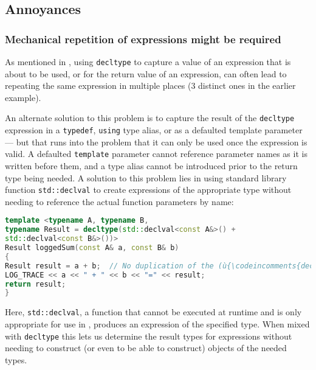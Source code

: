 \subsection[Annoyances]{Annoyances}\label{annoyances-decltype}

\subsubsection{Mechanical repetition of expressions might be required}\label{decltype-mechanical}

As mentioned in
,
using \lstinline!decltype! to capture a value of an expression that is about to be used, or for the return value of an expression, can often lead to repeating the same expression in multiple places (3 distinct ones in the earlier example).

An alternate solution to this problem is to capture the result of the \lstinline!decltype! expression in a \lstinline!typedef!, \lstinline!using! type alias, or as a defaulted template parameter --- but that runs into the problem that it can only be used once the expression is valid.  A defaulted \lstinline!template! parameter cannot reference parameter names as it is written before them, and a type alias cannot be introduced prior to the return type being needed.  A solution to this problem lies in using standard library function \lstinline!std::declval! to create expressions of the appropriate type without needing to reference the actual function parameters by name:

\begin{lstlisting}[language=C++]
template <typename A, typename B,
typename Result = decltype(std::declval<const A&>() +
std::declval<const B&>())>
Result loggedSum(const A& a, const B& b)
{
Result result = a + b;  // No duplication of the (ù{\codeincomments{decltype}}ù) expression
LOG_TRACE << a << " + " << b << "=" << result;
return result;
}
\end{lstlisting}

Here, \lstinline!std::declval!, a function that cannot be executed at runtime and is only appropriate for use in , produces an expression of the specified type.  When mixed with \lstinline!decltype! this lets us determine the result types for expressions without needing to construct (or even to be able to construct) objects of the needed types.

